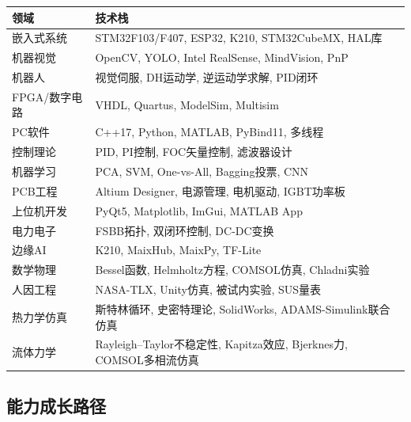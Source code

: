 \documentclass[12pt,a4paper]{ctexart}
\begin{document}
\begin{center}
\begin{longtable}{p{3cm}p{10cm}}
\toprule
\textbf{领域} & \textbf{技术栈} \\
\midrule
\endhead
嵌入式系统    & STM32F103/F407, ESP32, K210, STM32CubeMX, HAL库 \\
机器视觉      & OpenCV, YOLO, Intel RealSense, MindVision, PnP \\
机器人        & 视觉伺服, DH运动学, 逆运动学求解, PID闭环 \\
FPGA/数字电路 & VHDL, Quartus, ModelSim, Multisim \\
PC软件        & C++17, Python, MATLAB, PyBind11, 多线程 \\
控制理论      & PID, PI控制, FOC矢量控制, 滤波器设计 \\
机器学习      & PCA, SVM, One-vs-All, Bagging投票, CNN \\
PCB工程       & Altium Designer, 电源管理, 电机驱动, IGBT功率板 \\
上位机开发    & PyQt5, Matplotlib, ImGui, MATLAB App \\
电力电子      & FSBB拓扑, 双闭环控制, DC-DC变换 \\
边缘AI        & K210, MaixHub, MaixPy, TF-Lite \\
数学物理      & Bessel函数, Helmholtz方程, COMSOL仿真, Chladni实验 \\
人因工程      & NASA-TLX, Unity仿真, 被试内实验, SUS量表 \\
热力学仿真    & 斯特林循环, 史密特理论, SolidWorks, ADAMS-Simulink联合仿真 \\
流体力学      & Rayleigh--Taylor不稳定性, Kapitza效应, Bjerknes力, COMSOL多相流仿真 \\
\bottomrule
\end{longtable}
\end{center}

\subsection{能力成长路径}
\end{document}
